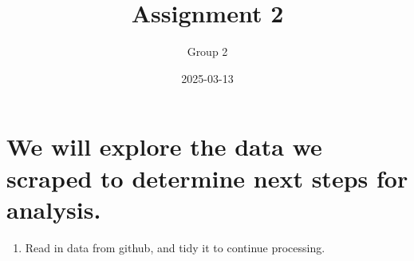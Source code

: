 \documentclass[
  letterpaper,
  DIV=11,
  numbers=noendperiod]{scrartcl}
\title{Assignment 2}
\author{Group 2}
\date{2025-03-13}
\providecommand{\tightlist}{%
  \setlength{\itemsep}{0pt}\setlength{\parskip}{0pt}}\usepackage{longtable,booktabs,array}
\begin{document}
\maketitle


\section{We will explore the data we scraped to determine next steps for
analysis.}\label{we-will-explore-the-data-we-scraped-to-determine-next-steps-for-analysis.}

\begin{enumerate}
\def\labelenumi{\arabic{enumi}.}
\tightlist
\item
  Read in data from github, and tidy it to continue processing.
\end{enumerate}
\end{document}
